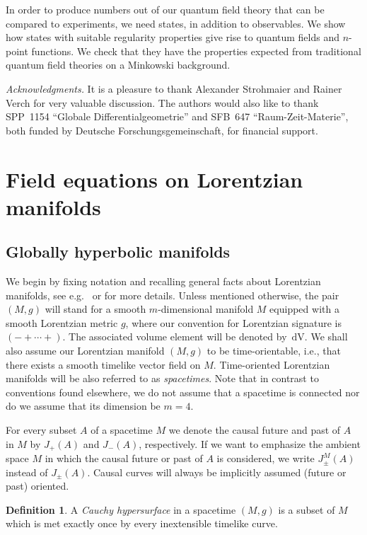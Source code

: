 \documentclass[a4paper,11pt]{amsart}
\theoremstyle{definition}
\newtheorem{definition}[thm]{Definition}
\begin{document}
In order to produce numbers out of our quantum field theory that can be compared to experiments, we need states, in addition to observables.
We show how states with suitable regularity properties give rise to quantum fields and $n$-point functions.
We check that they have the properties expected from traditional quantum field theories on a Minkowski background.

{\em Acknowledgments.}
It is a pleasure to thank Alexander Strohmaier and Rainer Verch for very valuable discussion.
The authors would also like to thank SPP~1154 ``Globale Differentialgeometrie'' and SFB~647 ``Raum-Zeit-Materie'', both funded by Deutsche Forschungsgemeinschaft, for financial support.

\section{Field equations on Lorentzian manifolds}

\subsection{Globally hyperbolic manifolds}

We begin by fixing notation and recalling general facts about Lorentzian manifolds, see e.g.\ \cite{ONeill} or \cite{BGP} for more details.
Unless mentioned otherwise, the pair $(M,g)$ will stand for a smooth $m$-dimensional manifold $M$ equipped with a smooth Lorentzian metric $g$, where our convention for Lorentzian signature is $(-+\cdots+)$.
The associated volume element will be denoted by ${\,\mathrm{dV}}$.
We shall also assume our Lorentzian manifold $(M,g)$ to be time-orientable, i.e., that there exists a smooth timelike vector field on $M$.
Time-oriented Lorentzian manifolds will be also referred to as \emph{spacetimes}.
Note that in contrast to conventions found elsewhere, we do not assume that a spacetime is connected nor do we assume that its dimension be $m=4$.

For every subset $A$ of a spacetime $M$ we denote the causal future and past of $A$ in $M$ by $J_+(A)$ and $J_-(A)$, respectively.
If we want to emphasize the ambient space $M$ in which the causal future or past of $A$ is considered, we write $J_\pm^M(A)$ instead of $J_\pm(A)$.
Causal curves will always be implicitly assumed (future or past) oriented.

\begin{definition}\label{def-Cauchyhyp}
A \emph{Cauchy hypersurface} in a spacetime $(M,g)$ is a subset of $M$ which is met exactly once by every inextensible timelike curve.
\end{definition}
 
\end{document}
